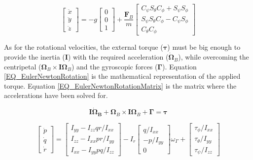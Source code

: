 		\begin{equation}
		\begin{bmatrix} \ddot{x}\\ \ddot{y}\\ \ddot{z} \end{bmatrix} = -g\begin{bmatrix} 0\\ 0\\ 1 \end{bmatrix} + \frac{\textbf{F}_B}{m} \begin{bmatrix}
		C_\psi S_\theta C_\phi + S_\psi S_\phi\\
		S_\psi S_\theta C_\phi - C_\psi S_\phi\\
		C_\theta C_\phi
		\end{bmatrix}
		\label{EQ_EulerNewtonInertialMatrix}
		\end{equation}
		
		As for the rotational velocities, the external torque ($\boldsymbol{\tau}$) must be big enough to provide the inertia ($\textbf{I}$) with the required acceleration ($\boldsymbol{\dot{\Omega}}_B$), while overcoming the centripetal ($\boldsymbol{\Omega}_B \times \textbf{I}\boldsymbol{\Omega}_B$) and the gyroscopic forces ($\boldsymbol{\Gamma}$). Equation \eqref{EQ_EulerNewtonRotation} is the mathematical representation of the applied torque. Equation \eqref{EQ_EulerNewtonRotationMatrix} is the matrix where the accelerations have been solved for.
		
		\begin{equation}
		\textbf{I} {\boldsymbol{\dot{\Omega}_B}} + \boldsymbol{\Omega}_B \times \textbf{I}\boldsymbol{\Omega}_B + \boldsymbol{\Gamma} = \boldsymbol{\tau}
		\label{EQ_EulerNewtonRotation}
		\end{equation}
		
		\begin{equation}
		\begin{bmatrix}\dot{p}\\ \dot{q} \\ \dot{r} \end{bmatrix} = \begin{bmatrix} I_{yy} - I_{zz}qr/I_{xx}\\ I_{zz} - I_{xx}pr/I_{yy}\\ I_{xx} - I_{yy}pq/I_{zz} \end{bmatrix} - I_r \begin{bmatrix} q/I_{xx}\\ -p/I_{yy} \\ 0 \end{bmatrix} \omega_\Gamma + \begin{bmatrix}\tau_\phi/I_{xx} \\ \tau_\theta/I_{yy} \\ \tau_\psi/I_{zz}  \end{bmatrix}
		\label{EQ_EulerNewtonRotationMatrix}
		\end{equation}
		
